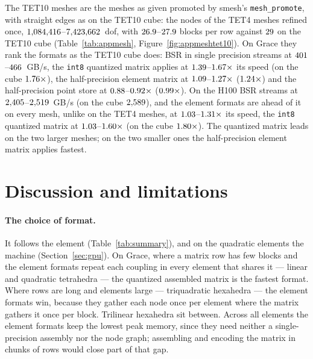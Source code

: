 \documentclass[sigconf,balance=false]{acmart}
\begin{document}
The TET10 meshes are the meshes as given promoted by smesh's \texttt{mesh\_promote}, with straight
edges as on the TET10 cube: the nodes of the TET4 meshes refined once,
$1{,}084{,}416$--$7{,}423{,}662$~dof, with $26.9$--$27.9$
blocks per row against $29$ on the TET10 cube (Table~\ref{tab:appmesh},
Figure~\ref{fig:appmeshtet10}).  On Grace they rank the formats as the TET10 cube does: BSR in single
precision streams at $401$--$466$~GB/s, the
\texttt{int8} quantized matrix applies at $1.39$--$1.67\times$
its speed (on the cube $1.76\times$), the half-precision element matrix at
$1.09$--$1.27\times$ ($1.24\times$)
and the half-precision point store at $0.88$--$0.92\times$
($0.99\times$).  On the H100 BSR streams at
$2{,}405$--$2{,}519$~GB/s (on the cube
$2{,}589$), and the element formats are ahead of it on every mesh, unlike on the
TET4 meshes, at $1.03$--$1.31\times$ its speed,
the \texttt{int8} quantized matrix at $1.03$--$1.60\times$
(on the cube $1.80\times$).  The quantized matrix leads on the two larger
meshes; on the two smaller ones the half-precision element matrix applies fastest.

\section{Discussion and limitations}
\label{sec:discussion}

\paragraph{The choice of format.}  It follows the element (Table~\ref{tab:summary}), and on the
quadratic elements the machine (Section~\ref{sec:gpu}).  On Grace, where a matrix
row has few blocks and the element formats repeat each coupling in every element that shares it ---
linear and quadratic tetrahedra --- the quantized assembled matrix is the fastest format.  Where
rows are long and elements large --- triquadratic hexahedra --- the element formats win, because they
gather each node once per element where the matrix gathers it once per block.  Trilinear hexahedra
sit between.  Across all elements the element formats keep the lowest peak memory, since they need
neither a single-precision assembly nor the node graph; assembling and encoding the matrix in chunks
of rows would close part of that gap.
\end{document}
